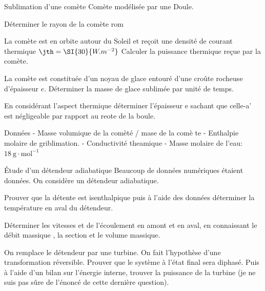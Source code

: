 \begin{exo}[PC][1][colle]{Sublimation d’une comète}
  Comète modélisée par une Doule.
\begin{quest}
\item Déterminer le rayon de la comète rom
\item La comète est en orbite autour du Soleil et reçoit une densité de courant thermique $\jth=\SI{30}{W.m^{-2}}$ Calculer la puissance thermique reçue par la comète.
\item La comète est constituée d'un noyau de glace entouré d'une croûte rocheuse d'épaisseur $e$.
Déterminer la masse de glace sublimée par unité de temps.
\item En considérant l'aspect thermique déterminer l'épaisseur e sachant que celle-a' est négligeable par rapport au reote de la boule.
\end{quest}
Données
- Masse volumique de la comèté / mase de la comè te
- Enthalpie molaire de griblimation.
- Conductivité theamique
- Masse molaire de l'eau: $18 \mathrm{~g} \cdot \mathrm{mol}^{-1}$
\end{exo}

\begin{exo}[PC][1][colle]{Étude d'un détendeur adiabatique}
Beaucoup de données numériques étaient données.
On considère un détendeur adiabatique.
\begin{quest}
\item Prouver que la détente est isenthalpique puis à l'aide des données déterminer la température
en aval du détendeur.
\item Déterminer les vitesses
et
de l'écoulement en amont et en aval, en connaissant le débit massique
, la section
et le volume massique.
\item On remplace le détendeur par une turbine. On fait l'hypothèse d'une transformation réversible. Prouver que le système à l'état final sera diphasé. Puis à l'aide d'un bilan sur l'énergie interne, trouver la puissance de la turbine (je ne suis pas sûre de l'énoncé de cette dernière question).
\end{quest}
\end{exo}
